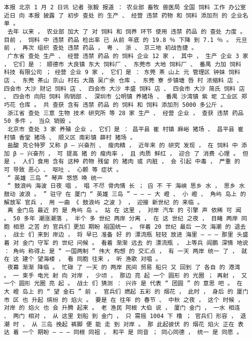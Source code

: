 \documentclass{article}
\begin{document}
\begin{Verbatim}[commandchars=\\\{\}]
 本报 北京 1 月 2 日讯 记者 张毅 报道 ： 农业部 畜牧 兽医局 全国 饲料 工作 办公室 近日 向 本报 披露 了 初步 查处 的 生产 、 经营 违禁 药物 和 饲料 添加剂 的 企业名单 。 
 去年 以来 ， 农业部 加大 了 对 饲料 和 饲养 环节 使用 违禁 药品 的 查处 力度 。 目前 ， 饲料 中 违禁 药品 检出率 已 从前 年底 的 19.8 ％ 下降 到 7.1 ％ 。 元旦 前 ， 再次 组织 查处 违禁 药品 ， 粤 、 浙 、 京三地 初战告捷 。 
 广东省 查处 生产 、 经营 违禁 药品 的 饲料 企业 12 家 ， 其中 ， 生产 企业 3 家 ， 它们 是 ： 顺德市 大良镇 东大 饲料厂 、 东莞市 大地 饲料厂 、 番禺 力加 饲料 科技 有限公司 ； 经营 企业 9 家 ， 它们 是 ： 东莞 茶 山上 元 管理区 钟妹 饲料 店 、 东莞 茶山 京山 村石 大路 吴广余 仓库 、 东莞 寮 步镇塘 唇 村 浓缩料 店 、 四会市 大沙 财记 饲料 店 、 四会市 大沙 丰盛 饲料 店 、 四会市 大沙 简氏 饲料 店 、 四会市 向阳 饲料 购销部 、 深圳市 公明镇 养猪场 、 番禺 沙湾镇 紫 坭 工业区 郑巧花 仓库 。 共 查获 含有 违禁 药品 的 饲料 和 饲料 添加剂 5000 多公斤 。 
 浙江省 查处 三意 生物 技术 研究所 等 28 家 生产 、 经营 企业 ， 查获 违禁 药品 50 多件 ， 当众 销毁 。 
 北京市 查处 3 家 养殖 企业 ， 它们 是 ： 昌平县 崔 村镇 麻峪 猪场 、 昌平县 崔 村镇 香堂 猪场 、 顺义区 南彩镇 薛村 猪场 。 
 盐酸 克仑特罗 又称 β — 兴奋剂 、 瘦肉精 ， 近年来 的 研究 发现 ， 在 饲料 中 添加 β — 兴奋剂 ， 可 提高 猪 的 瘦肉率 ， 且 肉质 鲜红 ， 迎合 了 消费 心理 。 但是 ， 人们 食用 含有 这种 药物 残留 的 猪肉 或 内脏 ， 会 引起 中毒 ， 严重 的 可 导致 恶心 、 呕吐 、 心颤 等 症状 。 
 “ 英雄 三岛 ” 琴声 悠悠 唤 统一 
 “ 鼓浪屿 海波 日夜 唱 ， 唱 不尽 骨肉情 长 ； 舀 不 干 海峡 思乡 水 ， 思乡 水 鼓动 波浪 。 ” 驻守 在 厦门 “ 英雄 三岛 ” — — — 大 嶝 、 小 嶝 、 角屿 岛上 的 解放军 官兵 ， 用 一曲 《 鼓浪屿 之波 》 ， 迎接 新世纪 的 来临 。 
 离 金门岛 最近 的 是 角屿 岛 。 站 在 这里 ， 对岸 汽车 的 引擎 声 依稀 可 闻 。 50 多年 潮涨潮落 ， 半个 多 世纪 两岸 分离 ， 在 这 世纪 之夜 ， 目睹 两岸 同胞 相思 之苦 的 官兵们 更加 期盼 祖国统一 。 伴着 20 世纪 最后 一次 海潮 的 退去 ， 战士 们 来到 岸边 ， 将 早已 准备 好 的 漂流瓶 轻轻 放进 海里 — — — 那里 头盛 着 对 金门 守军 的 世纪 问候 。 看着 渐渐 远去 的 漂流瓶 ， 上等兵 阎鹏 深情 地说 ： 角屿 称得上 是 “ 一国两制 ” 伟大 构想 的 交汇点 ， 有 一天 两岸 统一 了 ， 就 在 这 建个 望海楼 ， 看 同胞 往来 ， 听 渔歌 对唱 。 
 夜幕 渐渐 降临 。 忙碌 了 一天 的 两岸 民间 贸易 船只 又 回到 了 各自 的 港湾 。 一 束手 电光 射 向 对岸 ， 少顷 ， 那边 亮 起 一个 圆形 的 光圈 ； 再射 ， 又 一个 圆形 光圈 亮 起 。 战士 们 猜测 ： 兴许 是 代表 “ 团圆 ” 的 意思 吧 。 在 大 嶝 岛上 的 “ 望 金石 ” 前 ， 官兵们 燃起 五彩 的 烟花 ， 此时 ， 身后 的 厦门市 区 也 升起 缤纷 的 焰火 。 要是 在 往年 的 春节 、 中秋 之夜 ， 这个 时候 ， 对岸 的 焰火 也 会 升腾 起来 。 老 渔民 阿根 大伯 说 ， 厦门 金门 ， 一水 相连 、 两门 相对 ， 从 这里 划船 到 金门 ， 只 需摇 1004 下 橹 ； 官兵们 形容 ， 退潮 时 ， 从 三岛 挽起 裤脚 便 能 走 到 对岸 。 那 此起彼伏 的 烟花 焰火 正在 表达 着 一个 期盼 — — — 同根 同祖 ， 和平 是 同音 ； 同心同德 ， 统一 是 同愿 。 

\end{Verbatim}
\end{document}
